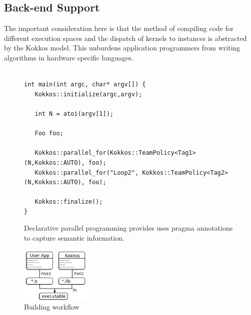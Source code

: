 \subsection{Back-end Support}\label{chap:kokkosBackend}




The important consideration here is that the method of compiling code for different execution spaces and the dispatch of kernels to instances is abstracted by the Kokkos model. This unburdens application programmers from writing algorithms in hardware specific languages.

\begin{figure}
\begin{Verbatim}[frame=leftline]

int main(int argc, char* argv[]) {
   Kokkos::initialize(argc,argv);

   int N = atoi(argv[1]);

   Foo foo;

   Kokkos::parallel_for(Kokkos::TeamPolicy<Tag1>(N,Kokkos::AUTO), foo);
   Kokkos::parallel_for("Loop2", Kokkos::TeamPolicy<Tag2>(N,Kokkos::AUTO), foo);
   
   Kokkos::finalize();
}

\end{Verbatim}
\caption{Declarative parallel programming provides uses pragma annotations to capture semantic information.}
\label{figOMPLike}
\end{figure}


\begin{figure}
\centerline{\includegraphics[width=0.3\textwidth]{img/Build.png}}
\caption{Building workflow}
\label{fig}
\end{figure}
